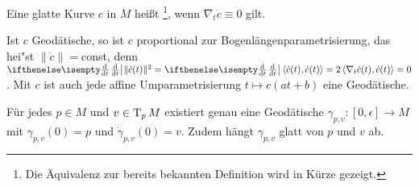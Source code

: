 \begin{Dfn}
  Eine glatte Kurve $c$ in $M$ heißt \footnote{Die Äquivalenz zur bereits bekannten Definition wird in Kürze gezeigt.}, wenn $\nabla_t\dot c \equiv 0$ gilt.
\end{Dfn}

Ist $c$ Geodätische, so ist $c$ proportional zur Bogenlängenparametrisierung, das hei"st $\|\dot c\| = $const, denn $\difffrac{}{t}\|\dot c(t)\|^{2} = \difffrac{}{t}\left<\dot c(t),\dot c(t) \right> = 2\left<\nabla_t\dot c(t), \dot c(t)\right> = 0$.
Mit $c$ ist auch jede affine Umparametrisierung $t \mapsto c(at + b)$ eine Geodätische.

\begin{Prop}
Für jedes $p \in M$ und $v \in \operatorname{T}_pM$ existiert genau eine Geodätische $\gamma_{p,v}\colon[0,\epsilon] \to M$ mit $\gamma_{p,v}(0) = p$ und $\dot \gamma_{p,v}(0) = v$.
Zudem hängt $\gamma_{p,v}$ glatt von $p$ und $v$ ab.
\end{Prop}


